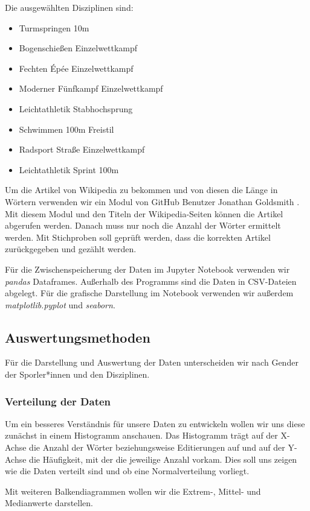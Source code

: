 \documentclass[11pt]{article}
\begin{document}
Die ausgewählten Disziplinen sind:
\begin{itemize}
\item Turmspringen 10m
\item Bogenschießen Einzelwettkampf
\item Fechten Épée Einzelwettkampf
\item Moderner Fünfkampf Einzelwettkampf
\item Leichtathletik Stabhochsprung
\item Schwimmen 100m Freistil
\item Radsport Straße Einzelwettkampf
\item Leichtathletik Sprint 100m
\end{itemize}

Um die Artikel von Wikipedia zu bekommen und von diesen die Länge in Wörtern verwenden wir ein Modul von GitHub Benutzer Jonathan Goldsmith \parencite{GoldsmithWikipedia}. Mit diesem Modul und den Titeln der Wikipedia-Seiten können die Artikel abgerufen werden. Danach muss nur noch die Anzahl der Wörter ermittelt werden. Mit Stichproben soll geprüft werden, dass die korrekten Artikel zurückgegeben und gezählt werden.

Für die Zwischenspeicherung der Daten im Jupyter Notebook verwenden wir \textit{pandas} Dataframes. Außerhalb des Programms sind die Daten in CSV-Dateien abgelegt. Für die grafische Darstellung im Notebook verwenden wir außerdem \textit{matplotlib.pyplot} und \textit{seaborn}.

\subsection{Auswertungsmethoden}
Für die Darstellung und Auswertung der Daten unterscheiden wir nach Gender der Sporler*innen und den Disziplinen.

\subsubsection{Verteilung der Daten}
Um ein besseres Verständnis für unsere Daten zu entwickeln wollen wir uns diese zunächst in einem Histogramm anschauen. Das Histogramm trägt auf der X-Achse die Anzahl der Wörter beziehungsweise Editierungen auf und auf der Y-Achse die Häufigkeit, mit der die jeweilige Anzahl vorkam. Dies soll uns zeigen wie die Daten verteilt sind und ob eine Normalverteilung vorliegt.

Mit weiteren Balkendiagrammen wollen wir die Extrem-, Mittel- und Medianwerte darstellen.
\end{document}
